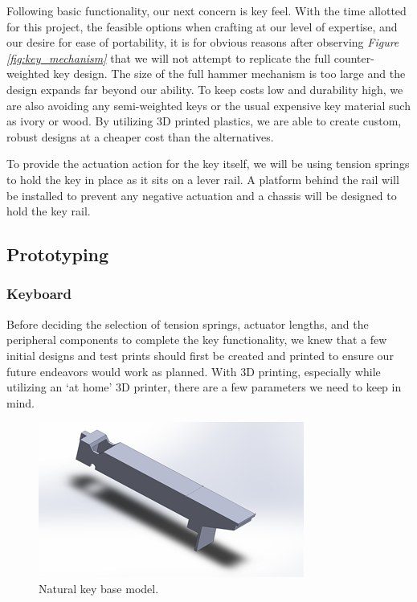 Following basic functionality, our next concern is key feel. With the time allotted for this project, the feasible options when crafting at our level of expertise, and our desire for ease of portability, it is for obvious reasons after observing \textit{Figure \ref{fig:key_mechanism}} that we will not attempt to replicate the full counter-weighted key design. The size of the full hammer mechanism is too large and the design expands far beyond our ability. To keep costs low and durability high, we are also avoiding any semi-weighted keys or the usual expensive key material such as ivory or wood. By utilizing 3D printed plastics, we are able to create custom, robust designs at a cheaper cost than the alternatives.

To provide the actuation action for the key itself, we will be using tension springs to hold the key in place as it sits on a lever rail. A platform behind the rail will be installed to prevent any negative actuation and a chassis will be designed to hold the key rail.

\subsection{Prototyping}

\subsubsection{Keyboard}

Before deciding the selection of tension springs, actuator lengths, and the peripheral components to complete the key functionality, we knew that a few initial designs and test prints should first be created and printed to ensure our future endeavors would work as planned. With 3D printing, especially while utilizing an ‘at home’ 3D printer, there are a few parameters we need to keep in mind.

\begin{figure}[h!]
  \centering
  \includegraphics[width=0.7\linewidth]{image/WhiteModel1.png}
  \caption{Natural key base model.}
  \label{fig:white_model1}
\end{figure}

